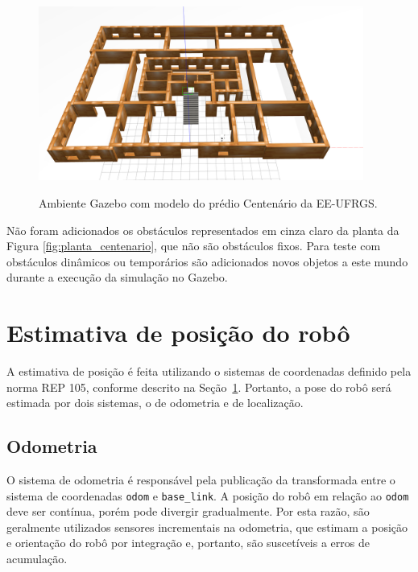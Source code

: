 \documentclass[repeatfields,xlists,xpacks,oneside,yearsonly]{ufrgscca}
\begin{document}
\begin{figure}[h]
    {
        \centering
        \caption{Ambiente Gazebo com modelo do prédio Centenário da EE-UFRGS.}
        \label{fig:gazebo_centenario}
        \includegraphics[width=0.95\textwidth]{gazebo.png}\\
    }
\end{figure}

Não foram adicionados os obstáculos representados em cinza claro da
planta da Figura \ref{fig:planta_centenario}, que não são obstáculos
fixos. Para teste com obstáculos dinâmicos ou temporários são
adicionados novos objetos a este mundo durante a execução da
simulação no Gazebo.

\section{Estimativa de posição do robô}
\label{bib:estimativa_posicao}

A estimativa de posição é feita utilizando o sistemas de coordenadas
definido pela norma REP 105, conforme descrito na
Seção~\ref{bib:estimativa_posicao}. Portanto, a pose do robô será
estimada por dois sistemas, o de odometria e de localização.

\subsection{Odometria}
\label{met:odometria}

O sistema de odometria é responsável pela publicação da transformada
entre o sistema de coordenadas \texttt{odom} e \texttt{base\_link}. A
posição do robô em relação ao \texttt{odom} deve ser contínua, porém
pode divergir gradualmente. Por esta razão, são geralmente utilizados
sensores incrementais na odometria, que estimam a posição e
orientação do robô por integração e, portanto, são suscetíveis a
erros de acumulação. 
\end{document}

